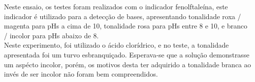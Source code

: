 \begin{figure}[h]
                \label{fig:experimento14}
        \end{figure}
		
		\indent Neste ensaio, os testes foram realizados com o indicador fenolftaleína, este indicador é utilizado para a detecção de bases, apresentando tonalidade roxa / magenta para pHs a cima de 10, tonalidade rosa para pHs entre 8 e 10, e branco / incolor para pHs abaixo de 8.\\
		
		\indent Neste experimento, foi utilizado o ácido clorídrico, e no teste, a tonalidade apresentada foi um turvo esbranquiçado. Esperava-se que a solução demonstrasse um aspécto incolor, porém, os motivos desta ter adquirido a tonalidade branca ao invés de ser incolor não foram bem compreendidos.\\
			
